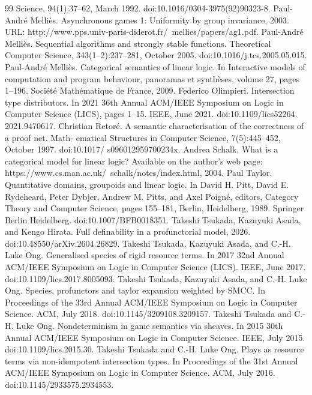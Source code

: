 \documentclass[10pt,a4paper]{article}
\begin{document}
\begin{thebibliography}{99}
Science, 94(1):37–62, March 1992. doi:10.1016/0304-3975(92)90323-8.
 Paul-André Melliès. Asynchronous games 1: Uniformity by group invariance, 2003. URL:
http://www.pps.univ-paris-diderot.fr/~mellies/papers/ag1.pdf.
 Paul-André Melliès. Sequential algorithms and strongly stable functions. Theoretical Computer
Science, 343(1–2):237–281, October 2005. doi:10.1016/j.tcs.2005.05.015.
 Paul-André Melliès. Categorical semantics of linear logic. In Interactive models of computation
and program behaviour, panoramas et synthèses, volume 27, pages 1–196. Société Mathématique
de France, 2009.
 Federico Olimpieri. Intersection type distributors. In 2021 36th Annual ACM/IEEE Symposium
on Logic in Computer Science (LICS), pages 1–15. IEEE, June 2021. doi:10.1109/lics52264.
2021.9470617.
 Christian Retoré. A semantic characterisation of the correctness of a proof net. Math-
ematical Structures in Computer Science, 7(5):445–452, October 1997. doi:10.1017/
s096012959700234x.
 Andrea Schalk. What is a categorical model for linear logic? Available on the author’s web
page: https://www.cs.man.ac.uk/~schalk/notes/index.html, 2004.
 Paul Taylor. Quantitative domains, groupoids and linear logic. In David H. Pitt, David E.
Rydeheard, Peter Dybjer, Andrew M. Pitts, and Axel Poigné, editors, Category Theory
and Computer Science, pages 155–181, Berlin, Heidelberg, 1989. Springer Berlin Heidelberg.
doi:10.1007/BFB0018351.
 Takeshi Tsukada, Kazuyuki Asada, and Kengo Hirata. Full definability in a profunctorial
model, 2026. doi:10.48550/arXiv.2604.26829.
 Takeshi Tsukada, Kazuyuki Asada, and C.-H. Luke Ong. Generalised species of rigid resource
terms. In 2017 32nd Annual ACM/IEEE Symposium on Logic in Computer Science (LICS).
IEEE, June 2017. doi:10.1109/lics.2017.8005093.
 Takeshi Tsukada, Kazuyuki Asada, and C.-H. Luke Ong. Species, profunctors and taylor
expansion weighted by SMCC. In Proceedings of the 33rd Annual ACM/IEEE Symposium on
Logic in Computer Science. ACM, July 2018. doi:10.1145/3209108.3209157.
 Takeshi Tsukada and C.-H. Luke Ong. Nondeterminism in game semantics via sheaves. In
2015 30th Annual ACM/IEEE Symposium on Logic in Computer Science. IEEE, July 2015.
doi:10.1109/lics.2015.30.
 Takeshi Tsukada and C.-H. Luke Ong. Plays as resource terms via non-idempotent intersection
types. In Proceedings of the 31st Annual ACM/IEEE Symposium on Logic in Computer
Science. ACM, July 2016. doi:10.1145/2933575.2934553.
\end{thebibliography}
\end{document}
